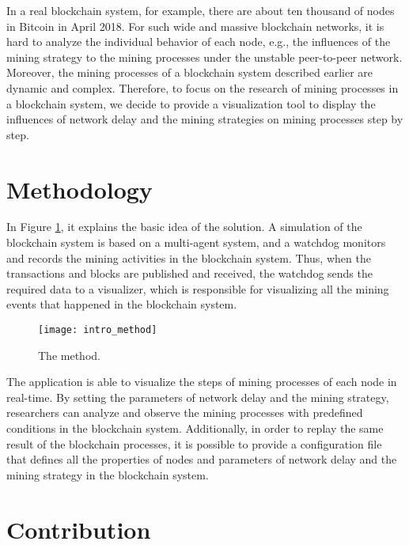 In a real blockchain system, for example, there are about ten thousand of nodes in Bitcoin in April 2018. For such wide and massive blockchain networks, it is hard to analyze the individual behavior of each node, e.g., the influences of the mining strategy to the mining processes under the unstable peer-to-peer network. Moreover, the mining processes of a blockchain system described earlier are dynamic and complex. Therefore, to focus on the research of mining processes in a blockchain system, we decide to provide a visualization tool to display the influences of network delay and the mining strategies on mining processes step by step.

\section{Methodology}

In Figure \ref{fig:the method}, it explains the basic idea of the solution. A simulation of the blockchain system is based on a multi-agent system, and a watchdog monitors and records the mining activities in the blockchain system. Thus, when the transactions and blocks are published and received, the watchdog sends the required data to a visualizer, which is responsible for visualizing all the mining events that happened in the blockchain system. 

\begin{figure}[htb]
    \centering
    \texttt{[image: intro\_method]}
    \caption{The method.}
    \label{fig:the method}
\end{figure}

The application is able to visualize the steps of mining processes of each node in real-time. By setting the parameters of network delay and the mining strategy, researchers can analyze and observe the mining processes with predefined conditions in the blockchain system. Additionally, in order to replay the same result of the blockchain processes, it is possible to provide a configuration file that defines all the properties of nodes and parameters of network delay and the mining strategy in the blockchain system.

\section{Contribution}

